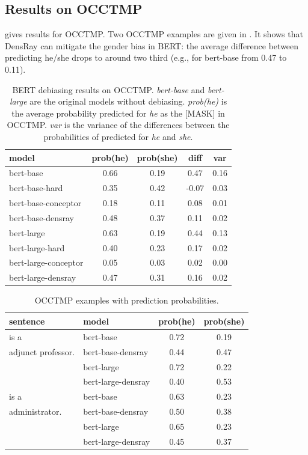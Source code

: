 
\subsection{Results on OCCTMP}
 gives results for OCCTMP. Two OCCTMP
examples are given in . It shows that
DensRay can mitigate the gender bias in BERT: the average
difference between predicting he/she drops to around two
third (e.g., for bert-base from 0.47 to 0.11).


\begin{table}[ht]
\centering
\footnotesize
\begin{tabular}{lcccc}
\hline
model & prob(he) & prob(she) & diff & var\\
\hline
bert-base & 0.66 & 0.19 & 0.47 &0.16\\
bert-base-hard & 0.35 & 0.42 & -0.07  &0.03\\
bert-base-conceptor & 0.18 & 0.11 & 0.08 & 0.01\\
bert-base-densray & 0.48 & 0.37 & {0.11} &0.02\\
\hline
bert-large  & 0.63 & 0.19 & 0.44  &0.13\\
bert-large-hard & 0.40 & 0.23 & 0.17  &0.02\\
bert-large-conceptor & 0.05 & 0.03 & 0.02 & 0.00\\
bert-large-densray  & 0.47 & 0.31 & {0.16} &0.02 \\
\hline
\end{tabular}
\caption{ BERT debiasing results on
  OCCTMP. \textit{bert-base} and \textit{bert-large} are the
  original models without debiasing. \textit{prob(he)} is
  the average probability  predicted for \textit{he} as
  the [MASK] in OCCTMP. \textit{var} is the variance of the
  differences between the probabilities of  predicted
  for \textit{he} and \textit{she}. }
\end{table}
\begin{table}[ht]
\centering
\footnotesize
\begin{tabular}{llcc}
\hline
sentence & model & prob(he) & prob(she)\\
\hline
[MASK] is a & 
\scriptsize bert-base 
& 0.72 & 0.19\\
adjunct professor. & 
\scriptsize bert-base-densray 
& 0.44 & 0.47\\
&\scriptsize bert-large
& 0.72 & 0.22\\
&\scriptsize bert-large-densray& 0.40 & 0.53\\
\hline
[MASK] is a 
&\scriptsize bert-base 
& 0.63 & 0.23\\
administrator.  
&\scriptsize bert-base-densray 
& 0.50 & 0.38\\
&\scriptsize bert-large & 0.65 & 0.23\\
&\scriptsize bert-large-densray & 0.45 & 0.37\\
\hline
\end{tabular}
\caption{
OCCTMP examples with prediction probabilities.}
\end{table}

